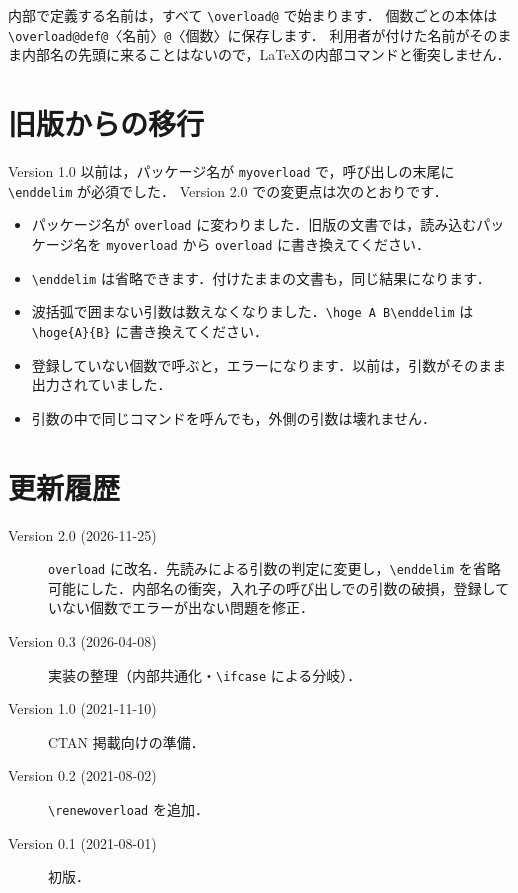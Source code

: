 \documentclass[lualatex,ja = standard,a4paper,11pt]{bxjsarticle}
\begin{document}
内部で定義する名前は，すべて \verb|\overload@| で始まります．
個数ごとの本体は \verb|\overload@def@|〈名前〉\verb|@|〈個数〉に保存します．
利用者が付けた名前がそのまま内部名の先頭に来ることはないので，\LaTeX の内部コマンドと衝突しません．

\section{旧版からの移行}

Version 1.0 以前は，パッケージ名が \texttt{myoverload} で，呼び出しの末尾に \verb|\enddelim| が必須でした．
Version 2.0 での変更点は次のとおりです．

\begin{itemize}
\item パッケージ名が \texttt{overload} に変わりました．旧版の文書では，読み込むパッケージ名を \texttt{myoverload} から \texttt{overload} に書き換えてください．
\item \verb|\enddelim| は省略できます．付けたままの文書も，同じ結果になります．
\item 波括弧で囲まない引数は数えなくなりました．\verb|\hoge A B\enddelim| は \verb|\hoge{A}{B}| に書き換えてください．
\item 登録していない個数で呼ぶと，エラーになります．以前は，引数がそのまま出力されていました．
\item 引数の中で同じコマンドを呼んでも，外側の引数は壊れません．
\end{itemize}

\section{更新履歴}

\begin{description}
\item[Version 2.0 (2026-11-25)] \texttt{overload} に改名．先読みによる引数の判定に変更し，\verb|\enddelim| を省略可能にした．内部名の衝突，入れ子の呼び出しでの引数の破損，登録していない個数でエラーが出ない問題を修正．
\item[Version 0.3 (2026-04-08)] 実装の整理（内部共通化・\verb|\ifcase| による分岐）．
\item[Version 1.0 (2021-11-10)] CTAN 掲載向けの準備．
\item[Version 0.2 (2021-08-02)] \verb|\renewoverload| を追加．
\item[Version 0.1 (2021-08-01)] 初版．
\end{description}
\end{document}
